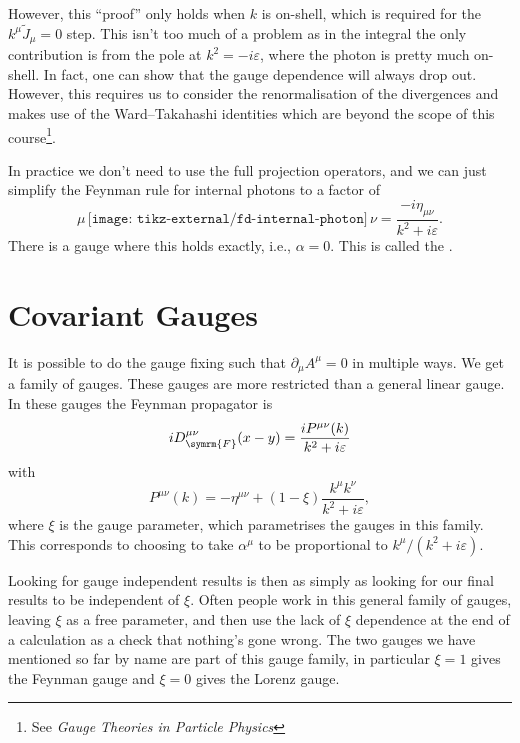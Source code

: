 \documentclass[fleqn]{NotesClass}
\newcommand*{\course}[1]{\textit{#1}}
\newcommand{\minkowskiMetric}{\eta}
\newcommand{\feynman}{\symrm{F}}
\begin{document}
    However, this \enquote{proof} only holds when \(k\) is on-shell, which is required for the \(k^\mu\tilde{J}_\mu = 0\) step.
    This isn't too much of a problem as in the integral the only contribution is from the pole at \(k^2 = -i\varepsilon\), where the photon is pretty much on-shell.
    In fact, one can show that the gauge dependence will always drop out.
    However, this requires us to consider the renormalisation of the divergences and makes use of the Ward--Takahashi identities which are beyond the scope of this course\footnote{See \course{Gauge Theories in Particle Physics}}.
    
    In practice we don't need to use the full projection operators, and we can just simplify the Feynman rule for internal photons to a factor of
    \begin{equation}
        \mu \, \texttt{[image: tikz-external/fd-internal-photon]} \, \nu = \frac{-i\minkowskiMetric_{\mu\nu}}{k^2 + i\varepsilon}.
    \end{equation}
    There is a gauge where this holds exactly, i.e., \(\alpha = 0\).
    This is called the .
    
    \section{Covariant Gauges}
    It is possible to do the gauge fixing such that \(\partial_\mu A^\mu = 0\) in multiple ways.
    We get a family of gauges.
    These gauges are more restricted than a general linear gauge.
    In these gauges the Feynman propagator is
    \begin{equation}
        iD^{\mu\nu}_{\feynman}(x - y) = \frac{i P^{\mu\nu}(k)}{k^2 + i\varepsilon}
    \end{equation}
    with
    \begin{equation}
        P^{\mu\nu}(k) = -\minkowskiMetric^{\mu\nu} + (1 - \xi) \frac{k^\mu k^\nu}{k^2 + i\varepsilon},
    \end{equation}
    where \(\xi\) is the gauge parameter, which parametrises the gauges in this family.
    This corresponds to choosing to take \(\alpha^\mu\) to be proportional to \(k^\mu/(k^2 + i\varepsilon)\).
    
    Looking for gauge independent results is then as simply as looking for our final results to be independent of \(\xi\).
    Often people work in this general family of gauges, leaving \(\xi\) as a free parameter, and then use the lack of \(\xi\) dependence at the end of a calculation as a check that nothing's gone wrong.
    The two gauges we have mentioned so far by name are part of this gauge family, in particular \(\xi = 1\) gives the Feynman gauge and \(\xi = 0\) gives the Lorenz gauge.
    
\end{document}
